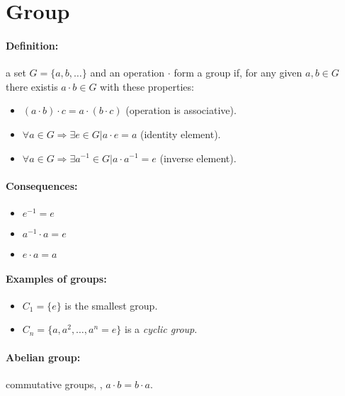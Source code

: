 \documentclass[a4paper,12pt]{article}
\begin{document}
\section{Group}

\paragraph{Definition:}a set $G = \{a, b, \ldots\}$ and an operation $\cdot$ form a group if, for any given $a,b\in G$ there existis $a\cdot b\in G$ with these properties:
\begin{itemize}
 \item $(a\cdot b)\cdot c = a\cdot(b\cdot c)$ (operation is associative).
 \item $\forall a\in G \Rightarrow \exists e\in G | a\cdot e = a$ (identity element).
 \item $\forall a\in G \Rightarrow \exists a^{-1}\in G | a\cdot a^{-1} = e$ (inverse element).
\end{itemize}

\paragraph{Consequences:}
\begin{itemize}
 \item $e^{-1} = e$
 \item $a^{-1}\cdot a = e$
 \item $e\cdot a = a$
\end{itemize}

\paragraph{Examples of groups:}
\begin{itemize}
 \item $C_1 = \{e\}$ is the smallest group.
 \item $C_n = \{a,a^2,\ldots,a^n = e\}$ is a \emph{cyclic group}.
\end{itemize}

\paragraph{Abelian group:} commutative groups, \ie, $a\cdot b = b\cdot a$.
\end{document}

